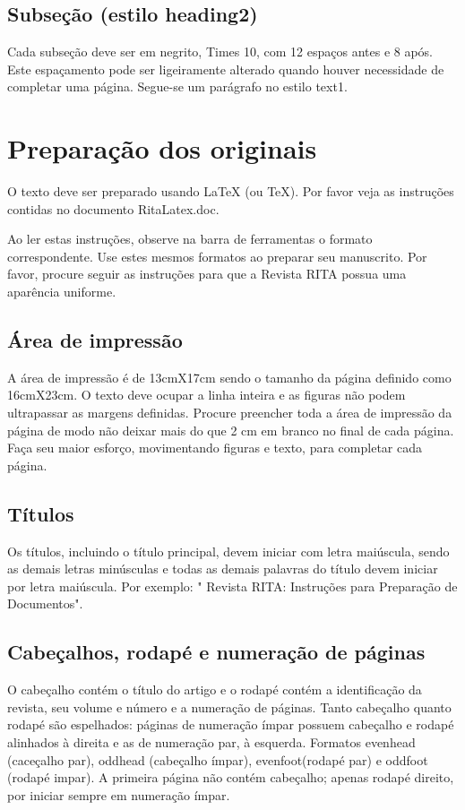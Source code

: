 \documentclass{RITA}
\begin{document}
\subsection{Subseção (estilo heading2)}
Cada subseção deve ser em negrito, Times 10, com 12 espaços antes e 8 após. Este espaçamento pode ser ligeiramente alterado quando houver necessidade de completar uma página. Segue-se um parágrafo no estilo text1.

\section{Preparação dos originais}
O texto deve ser preparado usando LaTeX (ou TeX). Por favor veja as instruções contidas no documento RitaLatex.doc.

Ao ler estas instruções, observe na barra de ferramentas o formato correspondente. Use estes mesmos formatos ao preparar seu manuscrito. Por favor, procure seguir as instruções para que a Revista RITA possua uma aparência uniforme.

\subsection{Área de impressão}
A área de impressão é de 13cmX17cm sendo o tamanho da página definido como 16cmX23cm. O texto deve ocupar a linha inteira e as figuras não podem ultrapassar as margens definidas. Procure preencher toda a área de impressão da página de modo não deixar mais do que 2 cm em branco no final de cada página. Faça seu maior esforço, movimentando figuras e texto, para completar cada página.

\subsection{Títulos}
Os títulos, incluindo o título principal, devem iniciar com letra maiúscula, sendo as demais letras minúsculas e todas as demais palavras do título devem iniciar por letra maiúscula. Por exemplo: " Revista RITA: Instruções para Preparação de Documentos".  

\subsection{Cabeçalhos, rodapé e numeração de páginas}
O cabeçalho contém o título do artigo e o rodapé contém a identificação da revista, seu volume e número e a numeração de páginas. Tanto cabeçalho quanto rodapé são espelhados: páginas de numeração ímpar possuem cabeçalho e rodapé alinhados à direita e as de numeração par, à esquerda. Formatos evenhead (caceçalho par), oddhead (cabeçalho ímpar), evenfoot(rodapé par) e oddfoot (rodapé impar). A primeira página não contém cabeçalho; apenas rodapé direito, por iniciar sempre em numeração ímpar.
\end{document}

